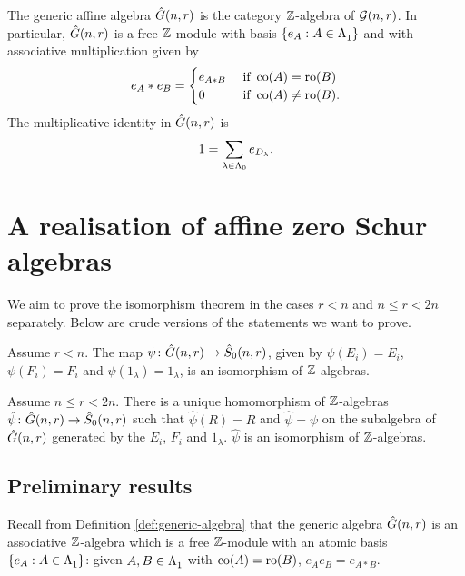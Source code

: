 \documentclass[a4paper, 11pt]{report}
\begin{document}
{\begin{definition}\label{def:generic-algebra}
The generic affine algebra $\hat{G}(n,r)$ is the category $\mathbb{Z}$-algebra of $\mathcal{G}(n,r)$. In particular, $\hat{G}(n,r)$ is a free $\mathbb{Z}$-module with basis $\{e_A:A\in\Lambda_1^{}\}$ and with associative multiplication given by
\begin{equation*}
e_A\ast e_B = \begin{cases}
e_{A\ast B} &\text{ if } \operatorname{co}(A)=\operatorname{ro}(B)\\
0 			&\text{ if } \operatorname{co}(A)\neq \operatorname{ro}(B).
\end{cases}
\end{equation*}
The multiplicative identity in $\hat{G}(n,r)$ is
\begin{equation*}
1 = \sum_{\lambda\in{\Lambda_0}}e_{D_\lambda}.
\end{equation*}
\end{definition}
}


\chapter{A realisation of affine zero Schur algebras}

We aim to prove the isomorphism theorem in the cases $r<n$ and $n\le r< 2n$ separately. Below are crude versions of the statements we want to prove.

\begin{theorem}
Assume $r<n$. The map $\psi\colon\hat{G}(n,r)\to\hat{S}_0(n,r)$, given by $\psi(E_i)=E_i$, $\psi(F_i)=F_i$ and $\psi(1_\lambda) = 1_\lambda$, is an isomorphism of $\mathbb{Z}$-algebras.
\end{theorem}

\begin{theorem}
Assume $n\le r< 2n$. There is a unique homomorphism of $\mathbb{Z}$-algebras $\hat{\psi}\colon\hat{G}(n,r)\to\hat{S}_0(n,r)$ such that $\hat{\psi}(R)=R$ and $\hat{\psi}=\psi$ on the subalgebra of $\hat{G}(n,r)$ generated by the $E_i$, $F_i$ and $1_\lambda$. $\hat{\psi}$ is an isomorphism of $\mathbb{Z}$-algebras.
\end{theorem}

\section{Preliminary results}

Recall from Definition \ref{def:generic-algebra} that the generic algebra $\hat{G}(n,r)$ is an associative $\mathbb{Z}$-algebra which is a free $\mathbb{Z}$-module with an atomic basis $\{e_A:A\in\Lambda_1^{}\}$: given $A,B\in\Lambda_1^{}$ with $\operatorname{co}(A)=\operatorname{ro}(B)$, $e_Ae_B = e_{A\ast B}$.
\end{document}
